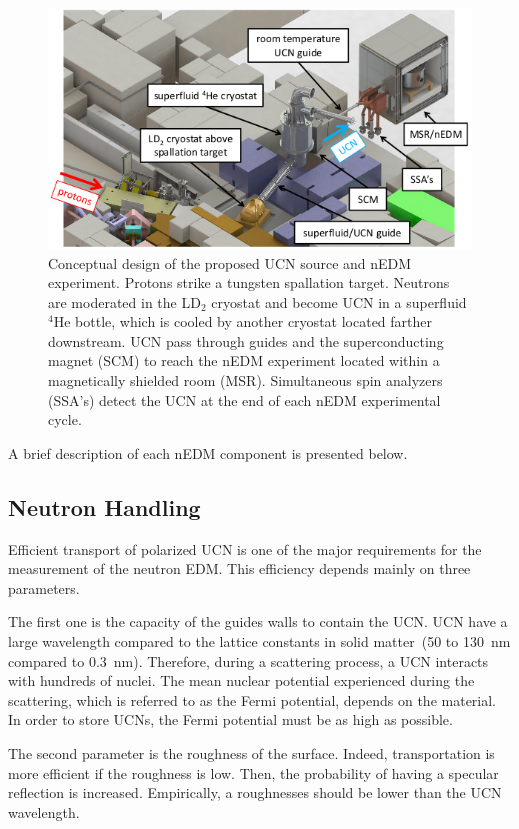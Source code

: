 \begin{figure}[h]
  \centering
  \includegraphics[width=1.0\textwidth]{edmtriumf.png}
  \caption{Conceptual design of the proposed UCN source and nEDM
    experiment. Protons strike a tungsten spallation target. Neutrons
    are moderated in the LD$_2$ cryostat and become UCN in a
    superfluid $^4$He bottle, which is cooled by another cryostat
    located farther downstream. UCN pass through guides and the
    superconducting magnet (SCM) to reach the nEDM experiment located
    within a magnetically shielded room (MSR). Simultaneous spin
    analyzers (SSA’s) detect the UCN at the end of each nEDM
    experimental cycle.  }
  \label{fig:triumfEDM}
\end{figure}

A brief description of each nEDM component is presented below.

\subsection{Neutron Handling}

Efficient transport of polarized UCN is one of the major requirements
for the measurement of the neutron EDM. This efficiency depends mainly
on three parameters.

The first one is the capacity of the guides walls to contain the
UCN. UCN have a large wavelength compared to the lattice constants in
solid matter~(50 to 130~nm compared to 0.3~nm). Therefore, during a
scattering process, a UCN interacts with hundreds of nuclei. The mean
nuclear potential experienced during the scattering, which is referred
to as the Fermi potential, depends on the material. In order to store
UCNs, the Fermi potential must be as high as possible.

The second parameter is the roughness of the surface. Indeed,
transportation is more efficient if the roughness is low. Then, the
probability of having a specular reflection is increased. Empirically,
a roughnesses should be lower than the UCN wavelength.

